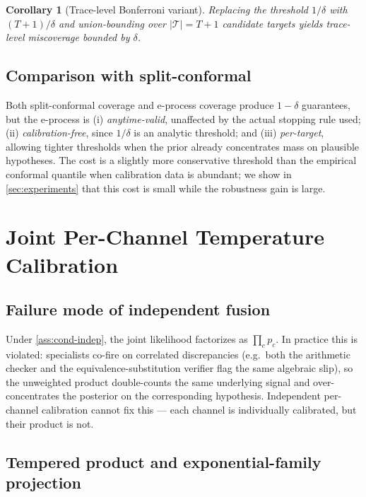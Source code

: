 \documentclass[11pt,a4paper]{article}
\newcommand{\Tcal}{\mathcal{T}}
\theoremstyle{plain}
\newtheorem{corollary}[theorem]{Corollary}
\theoremstyle{definition}
\theoremstyle{remark}
\begin{document}
\begin{corollary}[Trace-level Bonferroni variant]
\label{cor:eprocess-bonf}
Replacing the threshold $1/\delta$ with $(T+1)/\delta$ and
union-bounding over $|\Tcal| = T+1$ candidate targets yields
trace-level miscoverage bounded by $\delta$.
\end{corollary}

\subsection{Comparison with split-conformal}

Both split-conformal coverage and e-process coverage produce
$1-\delta$ guarantees, but the e-process is (i) \emph{anytime-valid},
unaffected by the actual stopping rule used; (ii)
\emph{calibration-free}, since $1/\delta$ is an analytic threshold;
and (iii) \emph{per-target}, allowing tighter thresholds when the
prior already concentrates mass on plausible hypotheses. The cost is
a slightly more conservative threshold than the empirical conformal
quantile when calibration data is abundant; we show in
\cref{sec:experiments} that this cost is small while the
robustness gain is large.

\section{Joint Per-Channel Temperature Calibration}
\label{sec:joint-calibration}

\subsection{Failure mode of independent fusion}

Under \cref{ass:cond-indep}, the joint likelihood factorizes as
$\prod_c p_c$. In practice this is violated: specialists co-fire on
correlated discrepancies (e.g.\ both the arithmetic checker and the
equivalence-substitution verifier flag the same algebraic slip), so
the unweighted product double-counts the same underlying signal and
over-concentrates the posterior on the corresponding hypothesis.
Independent per-channel calibration cannot fix this --- each channel
is individually calibrated, but their product is not.

\subsection{Tempered product and exponential-family projection}
\end{document}
